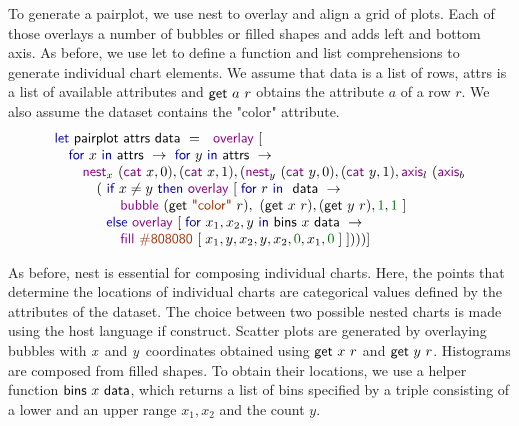 \documentclass{jfp}
\newcommand{\X}{\emph{x}\ }
\newcommand{\Y}{\emph{y}\ }
\newcommand{\num}[1]{\textcolor{numclr}{#1}}
\newcommand{\str}[1]{\textnormal{\textcolor{strclr}{\sffamily "#1"}}}
\newcommand{\strf}[1]{\textnormal{\textcolor{strclr}{\sffamily #1}}}
\newcommand{\ident}[1]{\textnormal{\textcolor{idclr}{\sffamily #1}}}
\newcommand{\kvd}[1]{\textnormal{\textcolor{kvdclr}{\sffamily #1}}}
\newcommand{\fkvd}[1]{\textnormal{\textcolor{fkvdclr}{\sffamily #1}}}
\begin{document}
To generate a pairplot, we use \kvd{nest} to overlay and align a grid of plots. Each of those
overlays a number of bubbles or filled shapes and adds left and bottom axis. As before, we use
\fkvd{let} to define a function and list comprehensions to generate individual chart elements.
We assume that \ident{data} is a list of rows, \ident{attrs} is a list of available attributes and
$\ident{get}~a~r$ obtains the attribute $a$ of a row $r$. We also assume the dataset contains the \str{color} attribute.
%
\begin{equation*}
\begin{array}{l}
\fkvd{let}~\ident{pairplot}~\ident{attrs}~\ident{data}~=~\kvd{overlay}~[\\
\quad \fkvd{for}~x~\fkvd{in}~\ident{attrs}~\rightarrow~\fkvd{for}~y~\fkvd{in}~\ident{attrs}~\rightarrow\\
\qquad \kvd{nest}_x~(\kvd{cat}~x, 0), (\kvd{cat}~x, 1), (\kvd{nest}_y~(\kvd{cat}~y, 0), (\kvd{cat}~y, 1), \kvd{axis}_l~(\kvd{axis}_b\\
\quad\qquad (~\fkvd{if}~x \neq y~\fkvd{then}~\kvd{overlay}~[\;\fkvd{for}~r~\fkvd{in}~\ident{data}~\rightarrow~\\
\qquad\qquad \hspace{0.7em} \kvd{bubble}~(\ident{get}~\str{color}~r),~(\ident{get}~x~r), (\ident{get}~y~r), \num{1}, \num{1}~]\\
 \quad\qquad \hspace{0.7em} \fkvd{else}~\kvd{overlay}~[\;\fkvd{for}~x_1, x_2, y~\fkvd{in}~\ident{bins}~x~\ident{data}~\rightarrow~\\
\qquad\qquad \hspace{0.7em}  \kvd{fill}~\strf{\#808080}~[\; x_1, y, x_2, y, x_2, \num{0}, x_1, \num {0}\;]\;])))] \\
\end{array}
\end{equation*}

\vspace{-0.5em}
\noindent
As before, \kvd{nest} is essential for composing individual charts. Here, the points that determine
the locations of individual charts are categorical values defined by the attributes of the dataset.
The choice between two possible nested charts is made using the host language \fkvd{if} construct.
Scatter plots are generated by overlaying bubbles with \X and \Y coordinates obtained using $\ident{get}~x~r$
and $\ident{get}~y~r$. Histograms are composed from filled shapes. To obtain their locations, we use
a helper function $\ident{bins}~x~\ident{data}$, which returns a list of bins specified by a triple
consisting of a lower and an upper range $x_1, x_2$ and the count $y$.
\end{document}
